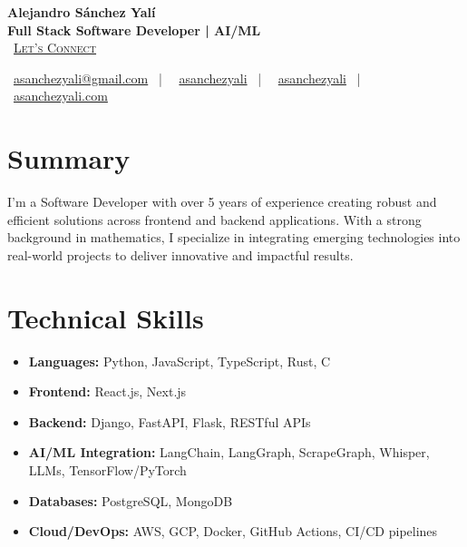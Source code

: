 \documentclass[letterpaper,11pt]{article}
\begin{document}
\begin{center}
\textbf{\Huge Alejandro Sánchez Yalí}\\[0.3em]
\textbf{\Large Full Stack Software Developer | AI/ML}\\[0.5em]
\small
\faCalendar\ \href{https://cal.com/asanchezyali/full-time-opportunities}{\textsc{Let's Connect}}

\vspace{1em}
\faEnvelope\ \href{mailto:asanchezyali@gmail.com}{asanchezyali@gmail.com}  ~|~
\faLinkedin\ \href{https://www.linkedin.com/in/asanchezyali}{asanchezyali} ~|~
\faGithub\ \href{https://github.com/asanchezyali}{asanchezyali}  ~|~
\faGlobe\ \href{https://asanchezyali.com}{asanchezyali.com}
\end{center}

\section{Summary}
I'm a Software Developer with over 5 years of experience creating robust and efficient solutions across frontend and backend applications. With a strong background in mathematics, I specialize in integrating emerging technologies into real-world projects to deliver innovative and impactful results.

\section{Technical Skills}
\begin{itemize}[leftmargin=*]
  \item \textbf{Languages:} Python, JavaScript, TypeScript, Rust, C
  \item \textbf{Frontend:} React.js, Next.js
  \item \textbf{Backend:} Django, FastAPI, Flask, RESTful APIs
  \item \textbf{AI/ML Integration:} LangChain, LangGraph, ScrapeGraph, Whisper, LLMs, TensorFlow/PyTorch
  \item \textbf{Databases:} PostgreSQL, MongoDB
  \item \textbf{Cloud/DevOps:} AWS, GCP, Docker, GitHub Actions, CI/CD pipelines
\end{itemize}
\end{document}
